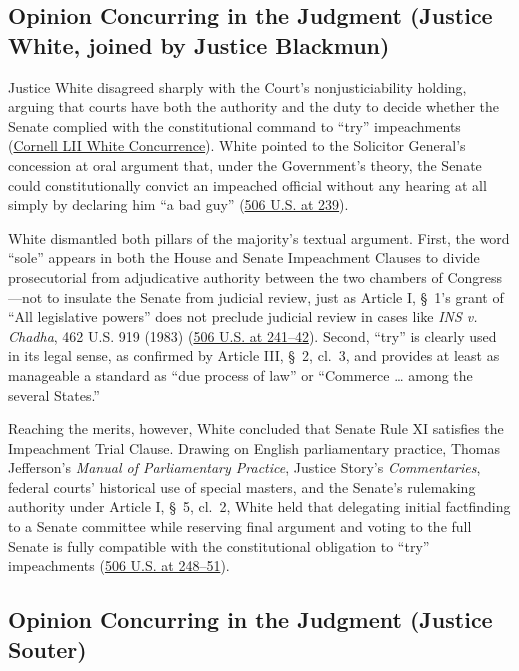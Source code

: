 \documentclass[12pt]{article}
\begin{document}
\subsection{Opinion Concurring in the Judgment (Justice White, joined by Justice Blackmun)}

Justice White disagreed sharply with the Court's nonjusticiability holding, arguing that courts have both the authority and the duty to decide whether the Senate complied with the constitutional command to ``try'' impeachments (\href{https://www.law.cornell.edu/supct/html/91-740.ZC1.html}{Cornell LII White Concurrence}). White pointed to the Solicitor General's concession at oral argument that, under the Government's theory, the Senate could constitutionally convict an impeached official without any hearing at all simply by declaring him ``a bad guy'' (\href{https://supreme.justia.com/cases/federal/us/506/224/}{506 U.S. at 239}).

White dismantled both pillars of the majority's textual argument. First, the word ``sole'' appears in both the House and Senate Impeachment Clauses to divide prosecutorial from adjudicative authority between the two chambers of Congress---not to insulate the Senate from judicial review, just as Article I, \S~1's grant of ``All legislative powers'' does not preclude judicial review in cases like \textit{INS v. Chadha}, 462 U.S. 919 (1983) (\href{https://supreme.justia.com/cases/federal/us/506/224/}{506 U.S. at 241--42}). Second, ``try'' is clearly used in its legal sense, as confirmed by Article III, \S~2, cl.\ 3, and provides at least as manageable a standard as ``due process of law'' or ``Commerce \dots{} among the several States.''

Reaching the merits, however, White concluded that Senate Rule XI satisfies the Impeachment Trial Clause. Drawing on English parliamentary practice, Thomas Jefferson's \textit{Manual of Parliamentary Practice}, Justice Story's \textit{Commentaries}, federal courts' historical use of special masters, and the Senate's rulemaking authority under Article I, \S~5, cl.\ 2, White held that delegating initial factfinding to a Senate committee while reserving final argument and voting to the full Senate is fully compatible with the constitutional obligation to ``try'' impeachments (\href{https://supreme.justia.com/cases/federal/us/506/224/}{506 U.S. at 248--51}).

\subsection{Opinion Concurring in the Judgment (Justice Souter)}
\end{document}
